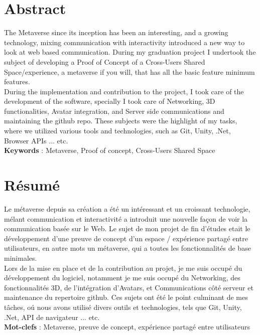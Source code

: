 
\chapter*{Abstract}
\label{chap:Abstract}
%
%

The Metaverse since its inception has been an interesting, and a growing 
technology, mixing communication with interactivity introduced a new way to 
look at web based communication. During my graduation project I undertook the subject 
of developing a Proof of Concept of a Cross-Users Shared Space/experience, a metaverse if you will, that has all the basic feature   
minimum features.\\
During the implementation and contribution to the project, I took care of the development
of the software, specially I took care of Networking, 3D functionalities, Avatar integration, 
and Server side communications and maintaining the github repo.
These subjects were the highlight of my tasks, where we utilized various tools and technologies,
such as Git, Unity, .Net, Browser APIs ... etc.\\
\textbf{Keywords} : Metaverse, Proof of concept, Cross-Users Shared Space
\clearpage%
\chapter*{R\'esum\'e}
%
%

Le m\'etaverse depuis sa cr\'eation a \'et\'e un int\'eressant et un croissant
technologie, m\'elant communication et interactivit\'e a introduit une nouvelle façon de
voir la communication bas\'ee sur le Web. Le sujet de mon projet de fin d'\'etudes etait le d\'eveloppement d'une preuve de concept d'un espace / exp\'erience partag\'e entre utilisateurs, 
en autre mots un m\'etaverse, qui a toutes les fonctionnalit\'es de base minimales.\\
Lors de la mise en place et de la contribution au projet, je me suis occup\'e du d\'eveloppement
du logiciel, notamment je me suis occup\'e du Networking, des fonctionnalit\'es 3D, de l'int\'egration d'Avatars,
et Communications c\^ot\'e serveur et maintenance du repertoire github.
Ces sujets ont \'et\'e le point culminant de mes t\^aches, o\'u nous avons utilis\'e divers outils et technologies,
tels que Git, Unity, .Net, API de navigateur ... etc.\\
\textbf{Mot-clefs} : Metaverse, preuve de concept, exp\'erience partag\'e entre utilisateurs
\clearpage%